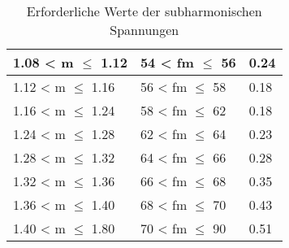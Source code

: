 \begin{table}[ht!]
\begin{tabular}{|l|l|l|}
		1.08 < m $\leq$ 1.12                                                                            & 54 < fm $\leq$ 56                                                                                                    & 0.24                        \\ \hline
		1.12 < m $\leq$ 1.16                                                                            & 56 < fm $\leq$ 58                                                                                                    & 0.18                        \\ \hline
		1.16 < m $\leq$ 1.24                                                                            & 58 < fm $\leq$ 62                                                                                                    & 0.18                        \\ \hline
		1.24 < m $\leq$ 1.28                                                                            & 62 < fm $\leq$ 64                                                                                                    & 0.23                        \\ \hline
		1.28 < m $\leq$ 1.32                                                                            & 64 < fm $\leq$ 66                                                                                                    & 0.28                        \\ \hline
		1.32 < m $\leq$ 1.36                                                                            & 66 < fm $\leq$ 68                                                                                                    & 0.35                        \\ \hline
		1.36 < m $\leq$ 1.40                                                                             & 68 < fm $\leq$ 70                                                                                                    & 0.43                        \\ \hline
		1.40 < m $\leq$ 1.80                                                                              & 70 < fm $\leq$ 90                                                                                                    & 0.51                        \\ \hline
	\end{tabular}
	\caption{Erforderliche Werte der subharmonischen Spannungen}\label{tab:subharmonische_Spannung}
\end{table}

